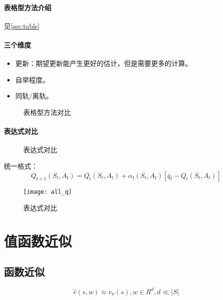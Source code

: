 \documentclass[
12pt, %
a4paper, 
oneside, %
headinclude,footinclude, %
]{scrartcl}
\begin{document}
\paragraph{表格型方法介绍}\label{sec:table back}
见\ref{sec:table}
\paragraph{三个维度}
\begin{itemize}
\item 更新：期望更新能产生更好的估计，但是需要更多的计算。
\item 自举程度。
\item 同轨/离轨。
\end{itemize}

\begin{figure}[H]
\centering
{} \quad
{}
\caption[表格型方法对比]{表格型方法对比}
\end{figure}
\paragraph{表达式对比}
\begin{figure}[H]
\centering
{} \quad
{} \quad
{}
\caption[表达式对比]{表达式对比}
\end{figure}

统一格式：
$$ Q_{t + 1}(S_t, A_t) = Q_t(S_t, A_t) + \alpha_t(S_t, A_t)[\bar{q}_t - Q_t(S_t, A_t)] $$

\begin{figure}[H]
\centering
\texttt{[image: all\_q]}
\caption[表达式对比]{表达式对比}
\end{figure}
\section{值函数近似}
\subsection[函数近似]{函数近似}
$$ \hat{v}(s, w) \approx v_{\pi}(s), w \in R^d, d \ll |S| $$
\end{document}

